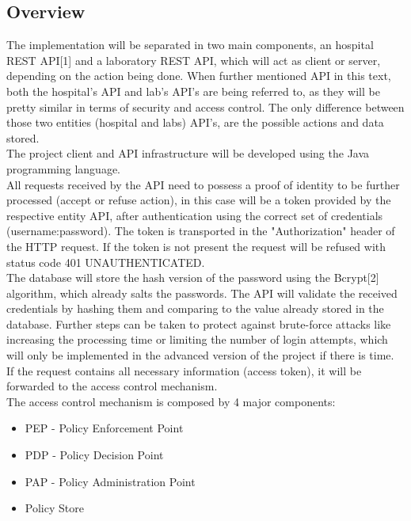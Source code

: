 \subsection{Overview}

The implementation will be separated in two main components, an hospital REST API[1] and a laboratory REST API, which will act as client or server, depending on the action being done. When further mentioned API in this text, both the hospital's API and lab's API's are being referred to, as they will be pretty similar in terms of security and access control. The only difference between those two entities (hospital and labs) API's, are the possible actions and data stored. \\

The project client and API infrastructure will be developed using the Java programming language. \\

All requests received by the API need to possess a proof of identity to be further processed (accept or refuse action), in this case will be a token provided by the respective entity API, after authentication using the correct set of credentials (username:password). The token is transported in the "Authorization" header of the HTTP request. If the token is not present the request will be refused with status code 401 UNAUTHENTICATED. \\

The database will store the hash version of the password using the Bcrypt[2] algorithm, which already salts the passwords. The API will validate the received credentials by hashing them and comparing to the value already stored in the database. Further steps can be taken to protect against brute-force attacks like increasing the processing time or limiting the number of login attempts, which will only be implemented in the advanced version of the project if there is time. \\


If the request contains all necessary information (access token), it will be forwarded to the access control mechanism. \\

The access control mechanism is composed by 4 major components:
\begin{itemize}
	\item PEP - Policy Enforcement Point
	\item PDP - Policy Decision Point
	\item PAP - Policy Administration Point
	\item Policy Store
\end{itemize}

